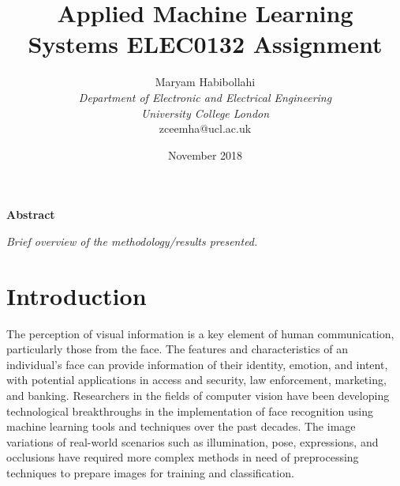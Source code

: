 \documentclass[conference]{IEEEtran}
\begin{document}
\title{Applied Machine Learning\\
 Systems ELEC0132 Assignment}
\author{\large Maryam Habibollahi\\ \textit{Department of Electronic and Electrical Engineering}\\ \textit{University College London}\\ zceemha@ucl.ac.uk}
\date{November 2018}
\maketitle

\setcounter{page}{1} 

\begin{center} \large \textbf{Abstract} \end{center}
\textit{Brief overview of the methodology/results presented.}\\

\section{Introduction} \label{s-intro}


The perception of visual information is a key element of human communication, particularly those from the face. The features and characteristics of an individual's face can provide information of their identity, emotion, and intent, with potential applications in access and security, law enforcement, marketing, and banking. Researchers in the fields of computer vision have been developing technological breakthroughs %
in the implementation of face recognition using machine learning tools and techniques over the past decades.
The image variations of real-world scenarios such as illumination, pose, expressions, and occlusions 
have required more complex methods in need of preprocessing techniques to prepare images for training and classification. 
\end{document}

